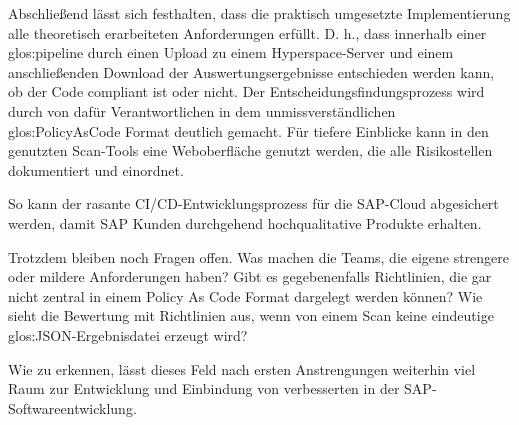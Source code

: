 \documentclass[../main.tex]{subfiles}
\begin{document}
Abschließend lässt sich festhalten, dass die praktisch umgesetzte Implementierung alle theoretisch erarbeiteten Anforderungen erfüllt.
D. h., dass innerhalb einer \gls{glos:pipeline} durch einen Upload zu einem Hyperspace-Server und einem anschließenden Download der Auswertungsergebnisse entschieden werden kann, ob der Code compliant ist oder nicht.
Der Entscheidungsfindungsprozess wird durch von dafür Verantwortlichen in dem unmissverständlichen \gls{glos:PolicyAsCode} Format deutlich gemacht.
Für tiefere Einblicke kann in den genutzten Scan-Tools eine Weboberfläche genutzt werden, die alle Risikostellen dokumentiert und einordnet.

So kann der rasante \gls{CI/CD}-Entwicklungsprozess für die SAP-Cloud abgesichert werden, damit SAP Kunden durchgehend hochqualitative Produkte erhalten.

Trotzdem bleiben noch Fragen offen.
Was machen die Teams, die eigene strengere oder mildere Anforderungen haben?
Gibt es gegebenenfalls Richtlinien, die gar nicht zentral in einem Policy As Code Format dargelegt werden können?
Wie sieht die Bewertung mit Richtlinien aus, wenn von einem Scan keine eindeutige \gls{glos:JSON}-Ergebnisdatei erzeugt wird?

Wie zu erkennen, lässt dieses Feld nach ersten Anstrengungen weiterhin viel Raum zur Entwicklung und Einbindung von verbesserten  in der SAP-Softwareentwicklung.
\end{document}
